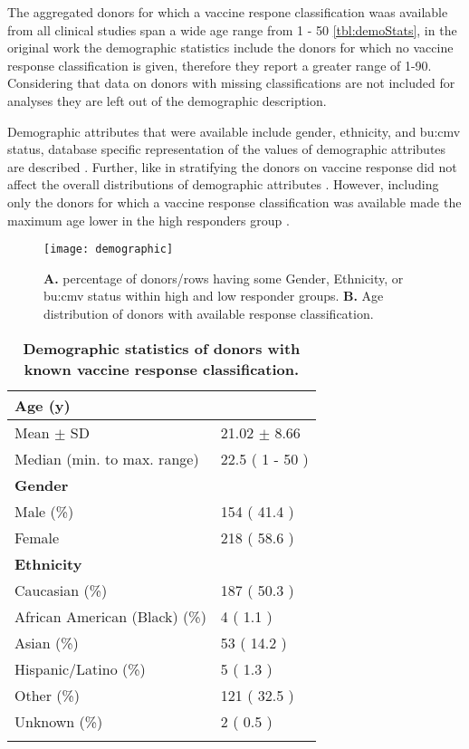 The aggregated donors for which a vaccine respone classification waas available from all clinical studies span a wide age range  from 1 - 50 \autoref{tbl:demoStats}, in the original work the demographic statistics include the donors for which no vaccine response classification is given, therefore they report a greater range of 1-90.
Considering that data on donors with missing classifications are not included for analyses they are left out of the demographic description.

Demographic attributes that were available include gender, ethnicity, and \gls{bu:cmv} status, database specific representation of the values of demographic attributes are described \dpaper.
Further, like in \dpaper stratifying the donors on vaccine response did not affect the overall distributions of demographic attributes .
However, including only the donors for which a vaccine response classification was available made the maximum age lower in the high responders group .

\begin{figure}[htpb]
    \texttt{[image: demographic]}
    \caption{\textbf{A.} percentage of donors/rows having some Gender, Ethnicity, or \gls{bu:cmv} status within high and low responder groups.
    \textbf{B.} Age distribution of donors with available response classification.}\label{fig:demoGraph}
\end{figure}



\begin{table}[htpb]
\centering
\begin{tabular}{ll}
\toprule
\textbf{Age (y)} & \\
\midrule
Mean $\pm$ SD & 21.02 $\pm$ 8.66\\
Median (min. to max. range) & 22.5  ( 1 - 50 )\\
\addlinespace
    \textbf{Gender} & \\
\midrule
Male (\%) & 154 ( 41.4 )\\
Female & 218  ( 58.6 )\\
\addlinespace
    \textbf{Ethnicity} & \\
\midrule
Caucasian (\%) & 187 ( 50.3 )\\
African American (Black) (\%) & 4  ( 1.1 )\\
Asian (\%) & 53  ( 14.2 )\\
Hispanic/Latino (\%) & 5  ( 1.3 )\\
Other (\%) & 121  ( 32.5 )\\
Unknown (\%) & 2  ( 0.5 )\\
\bottomrule{}
\end{tabular}
\caption{\textbf{Demographic statistics of donors with known vaccine response classification.}}\label{tbl:demoStats}
\end{table}

